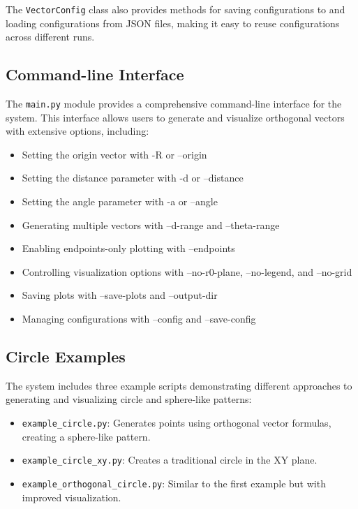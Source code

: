 The \texttt{VectorConfig} class also provides methods for saving configurations to and loading configurations from JSON files, making it easy to reuse configurations across different runs.

\subsection{Command-line Interface}

The \texttt{main.py} module provides a comprehensive command-line interface for the system. This interface allows users to generate and visualize orthogonal vectors with extensive options, including:

\begin{itemize}
    \item Setting the origin vector with -R or --origin
    \item Setting the distance parameter with -d or --distance
    \item Setting the angle parameter with -a or --angle
    \item Generating multiple vectors with --d-range and --theta-range
    \item Enabling endpoints-only plotting with --endpoints
    \item Controlling visualization options with --no-r0-plane, --no-legend, and --no-grid
    \item Saving plots with --save-plots and --output-dir
    \item Managing configurations with --config and --save-config
\end{itemize}

\subsection{Circle Examples}

The system includes three example scripts demonstrating different approaches to generating and visualizing circle and sphere-like patterns:

\begin{itemize}
    \item \texttt{example\_circle.py}: Generates points using orthogonal vector formulas, creating a sphere-like pattern.
    \item \texttt{example\_circle\_xy.py}: Creates a traditional circle in the XY plane.
    \item \texttt{example\_orthogonal\_circle.py}: Similar to the first example but with improved visualization.
\end{itemize}

